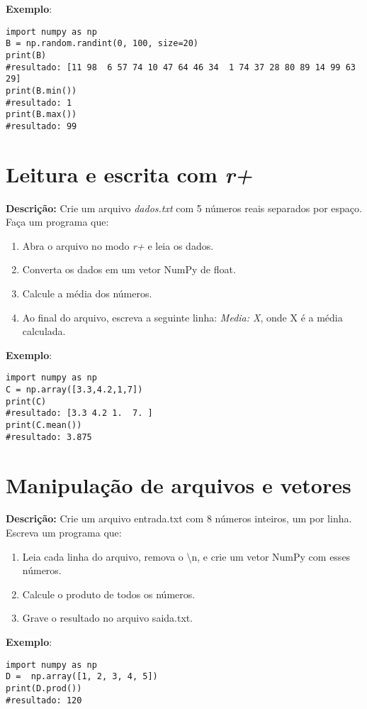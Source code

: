 \textbf{Exemplo}:
\begin{verbatim}
import numpy as np
B = np.random.randint(0, 100, size=20)
print(B)
#resultado: [11 98  6 57 74 10 47 64 46 34  1 74 37 28 80 89 14 99 63 29]
print(B.min())
#resultado: 1
print(B.max())
#resultado: 99
\end{verbatim}


\section{Leitura e escrita com \textit{r+}}

\textbf{Descrição:} Crie um arquivo \textit{dados.txt} com 5 números reais separados por espaço. Faça um programa que:

\begin{enumerate}
    \item  Abra o arquivo no modo \textit{r+} e leia os dados.
    \item  Converta os dados em um vetor NumPy de float.
    \item  Calcule a média dos números.
    \item Ao final do arquivo, escreva a seguinte linha: \textit{Media: X}, onde X é a média calculada.
\end{enumerate}

\textbf{Exemplo}:
\begin{verbatim}
import numpy as np  
C = np.array([3.3,4.2,1,7])
print(C)
#resultado: [3.3 4.2 1.  7. ]
print(C.mean())
#resultado: 3.875
\end{verbatim}

\section{Manipulação de arquivos e vetores}

\textbf{Descrição:} Crie um arquivo entrada.txt com 8 números inteiros, um por linha. Escreva um programa que:

\begin{enumerate}
    \item Leia cada linha do arquivo, remova o \textbackslash n, e crie um vetor NumPy com esses números.
    \item Calcule o produto de todos os números.
    \item Grave o resultado no arquivo saida.txt.
\end{enumerate}

\textbf{Exemplo}:
\begin{verbatim}
import numpy as np  
D =  np.array([1, 2, 3, 4, 5])
print(D.prod())
#resultado: 120
\end{verbatim}

